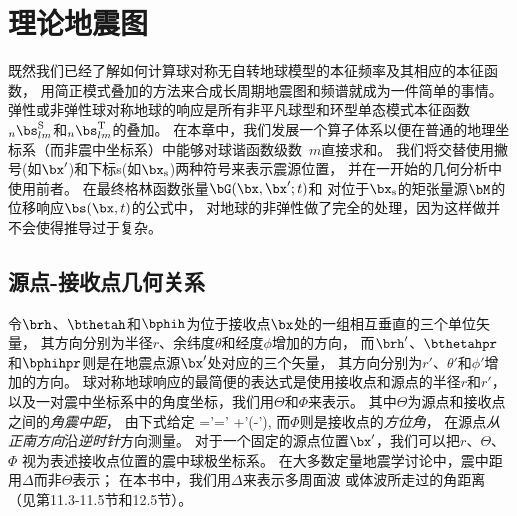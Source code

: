 \chapter{理论地震图}
\label{chapter:SNREIgrams}

既然我们已经了解如何计算球对称无自转地球模型的本征频率及其相应的本征函数，
用简正模式叠加的方法来合成长周期地震图和频谱就成为一件简单的事情。
弹性或非弹性球对称地球的响应是所有非平凡球型和环型单态模式本征函数${}_n\bs_{lm}^{\rm S}$和${}_n\bs_{lm}^{\rm T}$的叠加。
在本章中，我们发展一个算子体系以便在普通的地理坐标系（而非震中坐标系）中能够对球谐函数级数~$m$直接求和。
我们将交替使用撇号(如$\bx'$)和下标s(如$\bx_{\rm s}$)两种符号来表示震源位置，
并在一开始的几何分析中使用前者。
在最终格林函数张量$\bG(\bx,\bx';t)$和
对位于$\bx_{\rm s}$的矩张量源$\bM$的位移响应$\bs(\bx,t)$的公式中，
对地球的非弹性做了完全的处理，因为这样做并不会使得推导过于复杂。

\section{源点-接收点几何关系}
%
\label{section:10.1}

令$\brh$、$\bthetah$和$\bphih$为位于接收点$\bx$处的一组相互垂直的三个单位矢量，
其方向分别为半径$r$、余纬度$\theta$和经度$\phi$增加的方向，
而$\brh'$、$\bthetahpr$和$\bphihpr$则是在地震点源$\bx'$处对应的三个矢量，
其方向分别为$r'$、$\theta'$和$\phi'$增加的方向。
球对称地球响应的最简便的表达式是使用接收点和源点的半径$r$和$r'$，
以及一对震中坐标系中的角度坐标，我们用$\Theta$和$\Phi$来表示。
其中$\Theta$为源点和接收点之间的{\em 角震中距\/}，
%
%
由下式给定
\eq
\cos\Theta=\brh\cdot\brh'=\cos\theta\cos\theta'
+\sin\theta\sin\theta'\cos(\phi-\phi'),
\label{eq:10.cosdelta}
\en
而$\Phi$则是接收点的{\em 方位角\/}，
%
%
在源点{\em 从正南方向\/}沿{\em 逆时针\/}方向测量。
对于一个固定的源点位置$\bx'$，我们可以把$r$、$\Theta$、$\Phi$
视为表述接收点位置的震中球极坐标系。
在大多数定量地震学讨论中，震中距用$\Delta$而非$\Theta$表示；
在本书中，我们用$\Delta$来表示多周面波
%
%
或体波所走过的角距离（见第11.3-11.5节和12.5节）。

